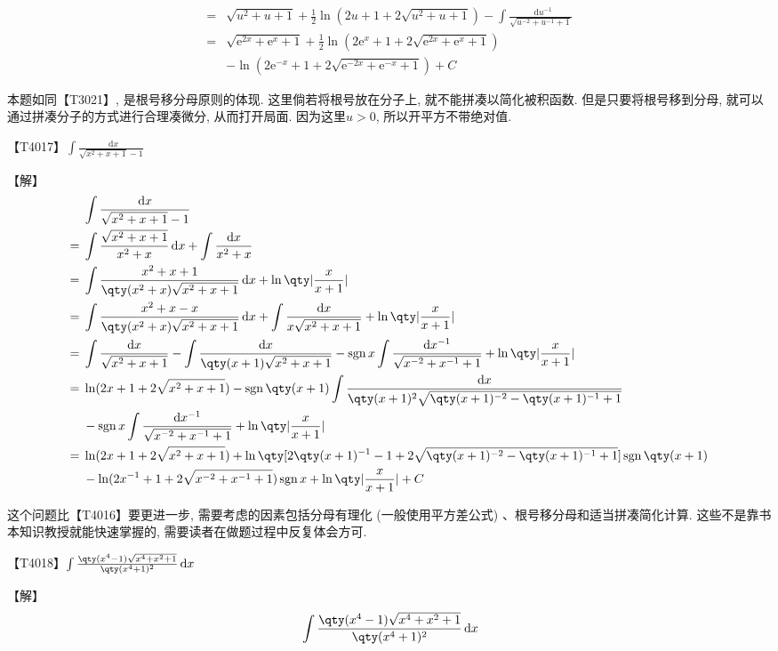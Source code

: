 \documentclass{ctexbook}
\DeclareMathOperator{\sgn}{sgn}
\newcommand{\e}{\mathrm{e}}
\newcommand*{\dif}{\mathop{}\!\mathrm{d}}
\begin{document}
{\begin{align*}
={}&\sqrt{u^{2}+u+1}+\frac{1}{2}\ln(2u+1+2\sqrt{u^{2}+u+1})-\int\frac{\dif{u^{-1}}}{\sqrt{u^{-2}+u^{-1}+1}}\\
={}&\sqrt{\e^{2x}+\e^{x}+1}+\frac{1}{2}\ln(2\e^{x}+1+2\sqrt{\e^{2x}+\e^{x}+1})\\
{}&-\ln(2\e^{-x}+1+2\sqrt{\e^{-2x}+\e^{-x}+1})+C
\end{align*}\par
{\kaishu 本题如同【T3021】, 是根号移分母原则的体现. 这里倘若将根号放在分子上, 就不能拼凑以简化被积函数. 但是只要将根号移到分母, 就可以通过拼凑分子的方式进行合理凑微分, 从而打开局面. 
因为这里$u>0$, 所以开平方不带绝对值. \par}
【T4017】$\int\frac{\dif{x}}{\sqrt{x^{2}+x+1}-1}$\par
【解】
\begin{align*}
{}&\int\frac{\dif{x}}{\sqrt{x^{2}+x+1}-1}\\
={}&\int\frac{\sqrt{x^{2}+x+1}}{x^{2}+x}\dif{x}+\int\frac{\dif{x}}{x^{2}+x}\\
={}&\int\frac{x^{2}+x+1}{\qty(x^{2}+x)\sqrt{x^{2}+x+1}}\dif{x}+\ln\qty|\frac{x}{x+1}|\\
={}&\int\frac{x^{2}+x-x}{\qty(x^{2}+x)\sqrt{x^{2}+x+1}}\dif{x}+\int\frac{\dif{x}}{x\sqrt{x^{2}+x+1}}+\ln\qty|\frac{x}{x+1}|\\
={}&\int\frac{\dif{x}}{\sqrt{x^{2}+x+1}}-\int\frac{\dif{x}}{\qty(x+1)\sqrt{x^{2}+x+1}}-\sgn{x}\int\frac{\dif{x^{-1}}}{\sqrt{x^{-2}+x^{-1}+1}}+\ln\qty|\frac{x}{x+1}|\\
={}&\ln(2x+1+2\sqrt{x^{2}+x+1})-\sgn{\qty(x+1)}\int\frac{\dif{x}}{\qty(x+1)^{2}\sqrt{\qty(x+1)^{-2}-\qty(x+1)^{-1}+1}}\\
{}&-\sgn{x}\int\frac{\dif{x^{-1}}}{\sqrt{x^{-2}+x^{-1}+1}}+\ln\qty|\frac{x}{x+1}|\\
={}&\ln(2x+1+2\sqrt{x^{2}+x+1})+\ln\qty[2\qty(x+1)^{-1}-1+2\sqrt{\qty(x+1)^{-2}-\qty(x+1)^{-1}+1}]\sgn{\qty(x+1)}\\
{}&-\ln(2x^{-1}+1+2\sqrt{x^{-2}+x^{-1}+1})\sgn{x}+\ln\qty|\frac{x}{x+1}|+C
\end{align*}\par
{\kaishu 这个问题比【T4016】要更进一步, 需要考虑的因素包括分母有理化 (一般使用平方差公式) 、根号移分母和适当拼凑简化计算. 这些不是靠书本知识教授就能快速掌握的, 需要读者在做题过程中反复体会方可. \par}
【T4018】$\int\frac{\qty(x^{4}-1)\sqrt{x^{4}+x^{2}+1}}{\qty(x^{4}+1)^{2}}\dif{x}$\par
【解】
\begin{align*}
{}&\int\frac{\qty(x^{4}-1)\sqrt{x^{4}+x^{2}+1}}{\qty(x^{4}+1)^{2}}\dif{x}\\

\end{align*}}
\end{document}
